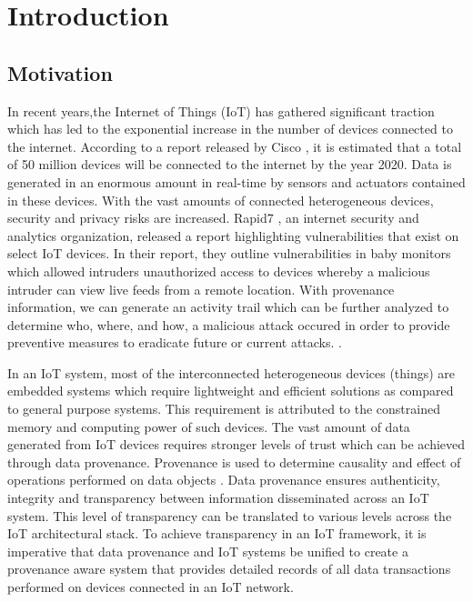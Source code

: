 \chapter{Introduction}\label{chapter:introduction}

\section{Motivation}
In recent years,the Internet of Things (IoT) has gathered significant traction which has led to the exponential increase in the number of devices connected to the internet. According to a report released by Cisco \cite{dave}, it is estimated that a total of 50 million devices will be connected to the internet by the year 2020. Data is generated in an enormous amount in real-time by sensors and actuators contained in these devices. With the vast amounts of connected heterogeneous devices,
security and privacy risks are increased. Rapid7 \cite{rapid7}, an  internet security and analytics organization, released a report highlighting vulnerabilities that exist on select IoT devices. In their report, they outline  vulnerabilities in
baby monitors which allowed intruders unauthorized access to devices
whereby a malicious intruder can view live feeds from a remote location. With provenance information, we can generate an activity trail which can be further analyzed to determine who, where, and how, a malicious attack occured in order to provide preventive measures to eradicate future or current attacks. \cite{cheney_provenance_2009}. 
\par In an IoT system, most of the interconnected heterogeneous devices (things) are embedded systems which
require lightweight and efficient solutions as compared to general purpose
systems. This requirement is attributed to the constrained memory and computing power of such
devices. The vast amount of data generated from IoT
devices requires stronger levels of trust which can be achieved through data
provenance. Provenance is used to determine causality and effect of 
operations performed on data objects \cite{glavic_case_2011}. Data provenance ensures
authenticity, integrity and transparency between information disseminated across an
IoT system. This level of transparency can be translated to various levels across the IoT architectural stack. To achieve transparency in an IoT framework, it is imperative that data provenance and IoT systems be unified to create a provenance aware system that provides detailed records of all data
transactions performed on devices connected in an IoT network. 


